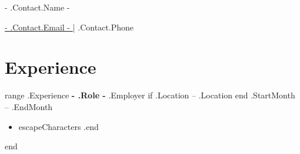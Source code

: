 \documentclass[10pt,letterpaper]{article}
\begin{document}

\centerline{\Huge { {{- .Contact.Name -}} }}

\vspace{5pt}


\centerline{\href{mailto:{{.Contact.Email -}} }{ {{- .Contact.Email -}} } | {{.Contact.Phone}} }

\vspace{-10pt}

\section*{Experience}

{{range .Experience}}
\textbf{ {{- .Role -}} } {{.Employer}}{{ if .Location }} -- {{.Location}} {{end}} \hfill {{.StartMonth}} -- {{.EndMonth}} \\
\vspace{-9pt}
\begin{itemize}{{range .Responsibilities}}
  \item {{escapeCharacters .}}{{end}}
\end{itemize}

{{end}}
\vspace{-18.5pt}


\end{document}
